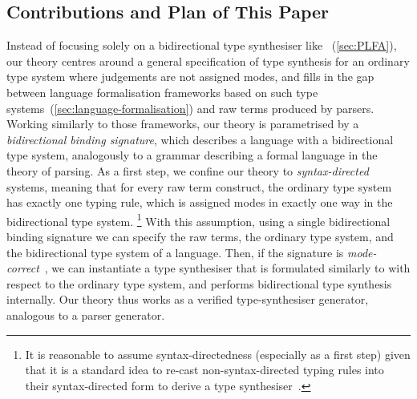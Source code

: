 \subsection{Contributions and Plan of This Paper}


Instead of focusing solely on a bidirectional type synthesiser like \citet{Wadler2022}~(\cref{sec:PLFA}), our theory centres around a general specification of type synthesis for an ordinary type system where judgements are not assigned modes, and fills in the gap between language formalisation frameworks based on such type systems~(\cref{sec:language-formalisation}) and raw terms produced by parsers.
Working similarly to those frameworks, our theory is parametrised by a \emph{bidirectional binding signature}, which describes a language with a bidirectional type system, analogously to a grammar describing a formal language in the theory of parsing.
As a first step, we confine our theory to \emph{syntax-directed} systems, meaning that for every raw term construct, the ordinary type system has exactly one typing rule, which is assigned modes in exactly one way in the bidirectional type system.%
\footnote{It is reasonable to assume syntax-directedness (especially as a first step) given that it is a standard idea to re-cast non-syntax-directed typing rules into their syntax-directed form to derive a type synthesiser~\citep{Peyton-Jones2007}.}
With this assumption, using a single bidirectional binding signature we can specify the raw terms, the ordinary type system, and the bidirectional type system of a language.
Then, if the signature is \emph{mode-correct}~\citep[Section~3.1]{Dunfield2021}, we can instantiate a type synthesiser that is formulated similarly to  with respect to the ordinary type system, and performs bidirectional type synthesis internally.
Our theory thus works as a verified type-synthesiser generator, analogous to a parser generator.

